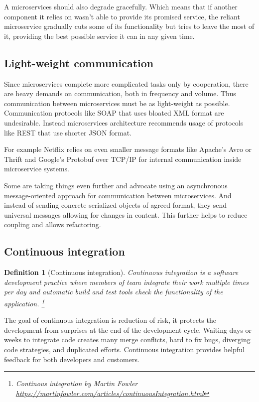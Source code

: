 \documentclass[12pt,oneside]{fithesis2}
\newtheorem{definition}{Definition}
\begin{document}
A microservices should also degrade gracefully. Which means that if another component it relies on wasn't able to provide its promised service, the reliant microservice gradually cuts some of its functionality but tries to leave the most of it, providing the best possible service it can in any given time.

\subsection{Light-weight communication}

Since microservices complete more complicated tasks only by cooperation, there are heavy demands on communication, both in frequency and volume. Thus communication between microservices must be as light-weight as possible. Communication protocols like SOAP that uses bloated XML format are undesirable. Instead microservices architecture recommends usage of protocols like REST that use shorter JSON format.

For example Netflix relies on even smaller message formats like Apache's Avro or Thrift and Google's Protobuf over TCP/IP for internal communication inside microservice systems. \cite{ma}

Some are taking things even further and advocate using an asynchronous message-oriented approach for communication between microservices. And instead of sending concrete serialized objects of agreed format, they send universal messages allowing for changes in content. This further helps to reduce coupling and allows refactoring.

\subsection{Continuous integration}

\begin{definition}[Continuous integration]
Continuous integration is a software development practice where members of team integrate their work multiple times per day and automatic build and test tools check the functionality of the application. \footnote{Continous integration by Martin Fowler \url{https://martinfowler.com/articles/continuousIntegration.html}}
\end{definition}

The goal of continuous integration is reduction of risk, it protects the development from surprises at the end of the development cycle. Waiting days or weeks to integrate code creates many merge conflicts, hard to fix bugs, diverging code strategies, and duplicated efforts. Continuous integration provides helpful feedback for both developers and customers.
\bigskip
\end{document}
